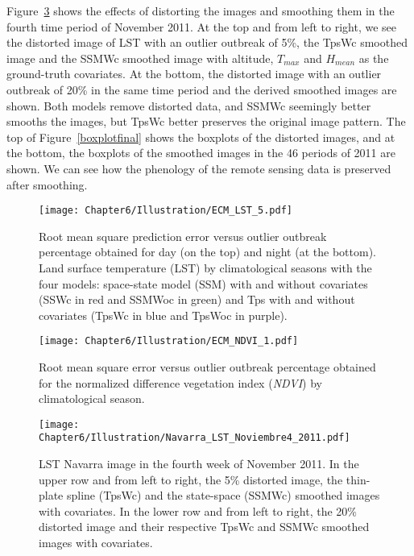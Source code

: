 Figure~\ref{salida} shows the effects of
distorting the images and smoothing them in the fourth time period of November 2011. At the top and from left to right, we see the distorted image of LST with an outlier outbreak of 5\%, the TpsWc smoothed image and the SSMWc smoothed image with altitude, $T_{max}$ and $H_{mean}$ as the ground-truth covariates.
At the bottom, the distorted image with an outlier outbreak of 20\% in the same time period and the derived smoothed images are shown. Both models remove distorted data, and SSMWc seemingly better smooths the images, but TpsWc better preserves the original image pattern. The top of Figure~\ref{boxplotfinal} shows the boxplots of the distorted images, and at the bottom, the boxplots of the smoothed images in the 46 periods of 2011 are shown. We can see how the phenology of the remote sensing data is preserved after smoothing.


\begin{figure}[ht]
 \centering
  \texttt{[image: Chapter6/Illustration/ECM\_LST\_5.pdf]}
  \caption{Root mean square prediction error versus outlier outbreak percentage obtained for day ({on the top}) and night ({at the bottom}).
  Land surface temperature (LST) by climatological seasons with the four models: space-state model (SSM) with and without covariates (SSWc in red and SSMWoc in green)
  and Tps with and without covariates (TpsWc in blue and TpsWoc in purple).}\label{LSTDayecm}
\end{figure}


\begin{figure}[ht]
 \centering
  \texttt{[image: Chapter6/Illustration/ECM\_NDVI\_1.pdf]}
  \caption{Root mean square error versus outlier outbreak percentage obtained for the normalized difference
  vegetation index (\emph{NDVI}) by climatological season.}\label{NDVIecm}
\end{figure}







\begin{figure}[ht]
 \centering
  \texttt{[image: Chapter6/Illustration/Navarra\_LST\_Noviembre4\_2011.pdf]}
  \caption{LST Navarra image in the fourth week of November 2011. In the upper row and from left to right, the 5\% distorted image, the thin-plate spline (TpsWc) and the state-space (SSMWc) smoothed images with covariates. In the lower row and from left to right, the 20\% distorted image and
 their respective TpsWc and SSMWc smoothed images with covariates.}\label{salida}
\end{figure}





